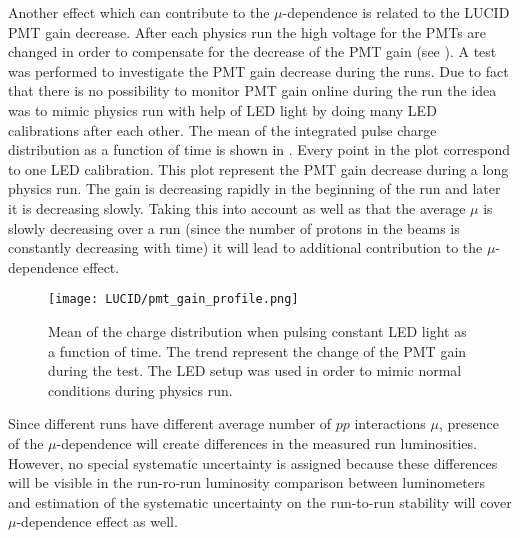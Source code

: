 Another effect which can contribute to the $\mu$-dependence is related to the LUCID PMT gain decrease.
After each physics run the high voltage for the PMTs are changed in order to compensate for the decrease of the PMT gain (see ).
A test was performed to investigate the PMT gain decrease during the runs. Due to fact that there is no possibility to monitor 
PMT gain online during the run the idea was to mimic physics run with help of LED light by doing many LED calibrations after each other.
The mean of the integrated pulse charge distribution as a function of time is shown in . Every point in the plot correspond to one LED calibration.
This plot represent the PMT gain decrease during a long physics run. The gain is decreasing rapidly in the beginning of the run and later it is decreasing slowly.
Taking this into account as well as that the average $\mu$ is slowly decreasing over a run 
(since the number of protons in the beams is constantly decreasing with time) it will lead to additional contribution to the $\mu$-dependence effect.

\begin{figure}
\centering
\texttt{[image: LUCID/pmt\_gain\_profile.png]}
\caption{Mean of the charge distribution when pulsing constant LED light as a function of time. The trend represent the change of the PMT gain during the test.
The LED setup was used in order to mimic normal conditions during physics run.}
\label{fig:pmt_gain_profile}
\end{figure}

Since different runs have different average number of $pp$ interactions $\mu$, presence of the $\mu$-dependence will create differences in the measured run luminosities.
However, no special systematic uncertainty is assigned because these differences will be visible in the run-ro-run luminosity comparison between luminometers 
and estimation of the systematic uncertainty on the run-to-run stability will cover $\mu$-dependence effect as well.

